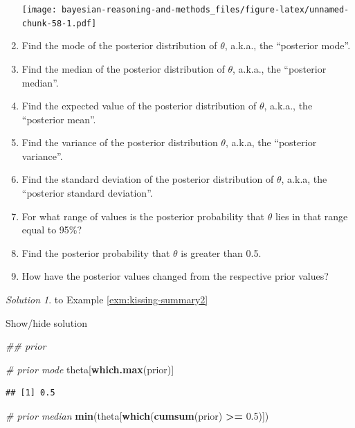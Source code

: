 \documentclass[
]{book}
\newenvironment{Shaded}{\begin{snugshade}}{\end{snugshade}}
\newcommand{\CommentTok}[1]{\textcolor[rgb]{0.56,0.35,0.01}{\textit{#1}}}
\newcommand{\FloatTok}[1]{\textcolor[rgb]{0.00,0.00,0.81}{#1}}
\newcommand{\KeywordTok}[1]{\textcolor[rgb]{0.13,0.29,0.53}{\textbf{#1}}}
\newcommand{\NormalTok}[1]{#1}
\newcommand{\OperatorTok}[1]{\textcolor[rgb]{0.81,0.36,0.00}{\textbf{#1}}}
\newcommand{\StringTok}[1]{\textcolor[rgb]{0.31,0.60,0.02}{#1}}
\theoremstyle{definition}
\theoremstyle{definition}
\theoremstyle{definition}
\theoremstyle{remark}
\newtheorem*{solution}{Solution}
\begin{document}
\begin{enumerate}
  \texttt{[image: bayesian-reasoning-and-methods\_files/figure-latex/unnamed-chunk-58-1.pdf]}
\item
  Find the mode of the posterior distribution of \(\theta\), a.k.a., the ``posterior mode''.
\item
  Find the median of the posterior distribution of \(\theta\), a.k.a., the ``posterior median''.
\item
  Find the expected value of the posterior distribution of \(\theta\), a.k.a., the ``posterior mean''.
\item
  Find the variance of the posterior distribution \(\theta\), a.k.a, the ``posterior variance''.
\item
  Find the standard deviation of the posterior distribution of \(\theta\), a.k.a, the ``posterior standard deviation''.
\item
  For what range of values is the posterior probability that \(\theta\) lies in that range equal to 95\%?
\item
  Find the posterior probability that \(\theta\) is greater than 0.5.
\item
  How have the posterior values changed from the respective prior values?
\end{enumerate}

\begin{solution}
{}to Example \ref{exm:kissing-summary2}
\end{solution}

Show/hide solution

\begin{Shaded}
\begin{Highlighting}[]
\CommentTok{\#\# prior}

\CommentTok{\# prior mode}
\NormalTok{theta[}\KeywordTok{which.max}\NormalTok{(prior)]}
\end{Highlighting}
\end{Shaded}

\begin{verbatim}
## [1] 0.5
\end{verbatim}

\begin{Shaded}
\begin{Highlighting}[]
\CommentTok{\# prior median}
\KeywordTok{min}\NormalTok{(theta[}\KeywordTok{which}\NormalTok{(}\KeywordTok{cumsum}\NormalTok{(prior) }\OperatorTok{\textgreater{}=}\StringTok{ }\FloatTok{0.5}\NormalTok{)])}
\end{Highlighting}
\end{Shaded}
\end{document}
